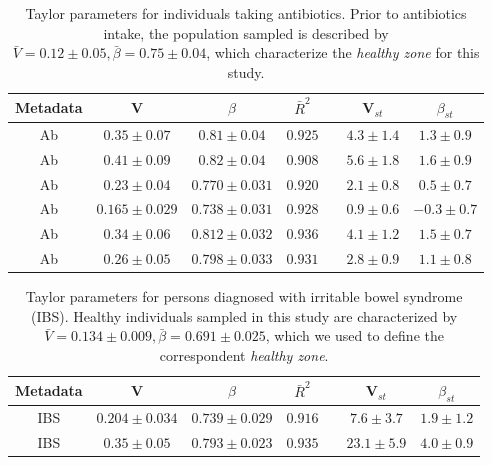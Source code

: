  \begin{table} 
  \begin{center}
    \begin{tabular}{ccccccc}
	    \hline
		Metadata&V&$\beta$&$\bar{R}^2$&&V$_{st}$&$\beta_{st}$\\
		\hline
		Ab&$0.35 \pm 0.07$&$0.81 \pm 0.04$&$0.925$&&$4.3 \pm 1.4$&$1.3 \pm 0.9$\\
		Ab&$0.41 \pm 0.09$&$0.82 \pm 0.04$&$0.908$&&$5.6 \pm 1.8$&$1.6 \pm 0.9$\\
		Ab&$0.23 \pm 0.04$&$0.770 \pm 0.031$&$0.920$&&$2.1 \pm 0.8$&$0.5 \pm 0.7$\\
		Ab&$0.165 \pm 0.029$&$0.738 \pm 0.031$&$0.928$&&$0.9 \pm 0.6$&$-0.3 \pm 0.7$\\
		Ab&$0.34 \pm 0.06$&$0.812 \pm 0.032$&$0.936$&&$4.1 \pm 1.2$&$1.5 \pm 0.7$\\
		Ab&$0.26 \pm 0.05$&$0.798 \pm 0.033$&$0.931$&&$2.8 \pm 0.9$&$1.1 \pm 0.8$\\
	    \hline
	    \hline
    \end{tabular}
  \end{center}
  \caption{Taylor parameters for individuals taking antibiotics\cite{antibiotic}. Prior to antibiotics intake, the population sampled is described by $\bar{V} = 0.12 \pm 0.05, \bar{\beta} = 0.75 \pm 0.04$, which characterize the \emph{healthy zone} for this study.}
  \label{tab:antibiotics}
\end{table}

\begin{table} 
  \begin{center}
    \begin{tabular}{ccccccc}
	    \hline
		Metadata&V&$\beta$&$\bar{R}^2$&&V$_{st}$&$\beta_{st}$\\
		\hline
		IBS&$0.204 \pm 0.034$&$0.739 \pm 0.029$&$0.916$&&$7.6 \pm 3.7$&$1.9 \pm 1.2$\\
		IBS&$0.35 \pm 0.05$&$0.793 \pm 0.023$&$0.935$&&$23.1 \pm 5.9$&$4.0 \pm 0.9$\\
	     \hline
	     \hline
    \end{tabular}
  \end{center}
  \caption{Taylor parameters for persons diagnosed with irritable bowel syndrome (IBS)\cite{IBS}. Healthy individuals sampled in this study are characterized by $\bar{V} = 0.134 \pm 0.009, \bar{\beta} = 0.691 \pm 0.025$, which we used to define the correspondent \emph{healthy zone}.}
  \label{tab:IBS}
\end{table}

